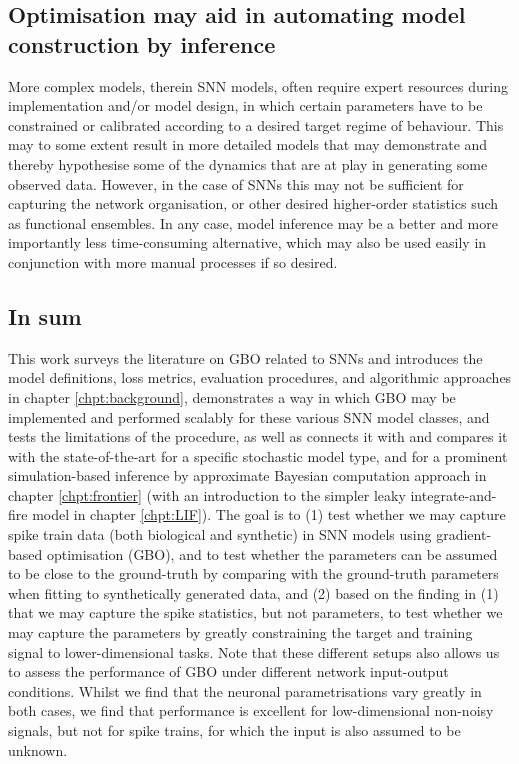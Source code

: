 \documentclass[mphil,deptreport,ianc]{infthesis} %
\begin{document}
\subsection*{Optimisation may aid in automating model construction by inference}

More complex models, therein SNN models, often require expert resources during implementation and/or model design, in which certain parameters have to be constrained or calibrated according to a desired target regime of behaviour.
This may to some extent result in more detailed models that may demonstrate and thereby hypothesise some of the dynamics that are at play in generating some observed data.
However, in the case of SNNs this may not be sufficient for capturing the network organisation, or other desired higher-order statistics such as functional ensembles. 
In any case, model inference may be a better and more importantly less time-consuming alternative, which may also be used easily in conjunction with more manual processes if so desired. 

\subsection*{In sum}\label{subsect:in_sum}

This work surveys the literature on GBO related to SNNs and introduces the model definitions, loss metrics, evaluation procedures, and algorithmic approaches in chapter \ref{chpt:background}, demonstrates a way in which GBO may be implemented and performed scalably for these various SNN model classes, and tests the limitations of the procedure, as well as connects it with and compares it with the state-of-the-art for a specific stochastic model type, and for a prominent simulation-based inference by approximate Bayesian computation approach in chapter \ref{chpt:frontier} (with an introduction to the simpler leaky integrate-and-fire model in chapter \ref{chpt:LIF}).
The goal is to (1) test whether we may capture spike train data (both biological and synthetic) in SNN models using gradient-based optimisation (GBO), and to test whether the parameters can be assumed to be close to the ground-truth by comparing with the ground-truth parameters when fitting to synthetically generated data, and (2) based on the finding in (1) that we may capture the spike statistics, but not parameters, to test whether we may capture the parameters by greatly constraining the target and training signal to lower-dimensional tasks. Note that these different setups also allows us to assess the performance of GBO under different network input-output conditions. Whilst we find that the neuronal parametrisations vary greatly in both cases, we find that performance is excellent for low-dimensional non-noisy signals, but not for spike trains, for which the input is also assumed to be unknown.
\end{document}

